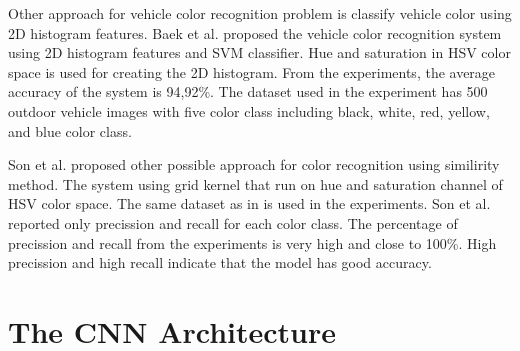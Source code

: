 \documentclass[conference]{IEEEtran}
\begin{document}
Other approach for vehicle color recognition problem is classify vehicle color using 2D histogram features. Baek et al. \cite{baek} proposed the vehicle color recognition system using 2D histogram features and SVM classifier. Hue and saturation in HSV color space is used for creating the 2D histogram. From the experiments, the average accuracy of the system is 94,92\%. The dataset used in the experiment has 500 outdoor vehicle images with five color class including black, white, red, yellow, and blue color class.

Son et al. \cite{jwson} proposed other possible approach for color recognition using similirity method. The system using grid kernel that run on hue and saturation channel of HSV color space. The same dataset as in \cite{baek} is used in the experiments. Son et al. reported only precission and recall for each color class. The percentage of precission and recall from the experiments is very high and close to 100\%. High precission and high recall indicate that the model has good accuracy.

\section{The CNN Architecture}
\end{document}

